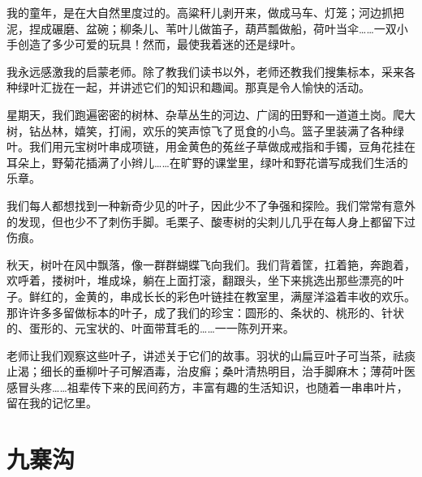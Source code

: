 \documentclass[12pt,UTF-8,openany]{ctexbook}
\begin{document}
\begin{large}
    
    我的童年，是在大自然里度过的。高粱秆儿剥开来，做成马车、灯笼；河边抓把泥，捏成碾磨、盆碗；柳条儿、苇叶儿做笛子，葫芦瓢做船，荷叶当伞……一双小手创造了多少可爱的玩具！然而，最使我着迷的还是绿叶。
    
    我永远感激我的启蒙老师。除了教我们读书以外，老师还教我们搜集标本，采来各种绿叶汇拢在一起，并讲述它们的知识和趣闻。那真是令人愉快的活动。
    
    星期天，我们跑遍密密的树林、杂草丛生的河边、广阔的田野和一道道土岗。爬大树，钻丛林，嬉笑，打闹，欢乐的笑声惊飞了觅食的小鸟。篮子里装满了各种绿叶。我们用元宝树叶串成项链，用金黄色的菟丝子草做成戒指和手镯，豆角花挂在耳朵上，野菊花插满了小辫儿……在旷野的课堂里，绿叶和野花谱写成我们生活的乐章。
    
    我们每人都想找到一种新奇少见的叶子，因此少不了争强和探险。我们常常有意外的发现，但也少不了刺伤手脚。毛栗子、酸枣树的尖刺儿几乎在每人身上都留下过伤痕。
    
    秋天，树叶在风中飘落，像一群群蝴蝶飞向我们。我们背着筐，扛着筢，奔跑着，欢呼着，搂树叶，堆成垛，躺在上面打滚，翻跟头，坐下来挑选出那些漂亮的叶子。鲜红的，金黄的，串成长长的彩色叶链挂在教室里，满屋洋溢着丰收的欢乐。那许许多多留做标本的叶子，成了我们的珍宝：圆形的、条状的、桃形的、针状的、蛋形的、元宝状的、叶面带茸毛的……一一陈列开来。
    
    老师让我们观察这些叶子，讲述关于它们的故事。羽状的山扁豆叶子可当茶，祛痰止渴；细长的垂柳叶子可解酒毒，治皮癣；桑叶清热明目，治手脚麻木；薄荷叶医感冒头疼……祖辈传下来的民间药方，丰富有趣的生活知识，也随着一串串叶片，留在我的记忆里。
    
\end{large}



\chapter{九寨沟}
\end{document}
